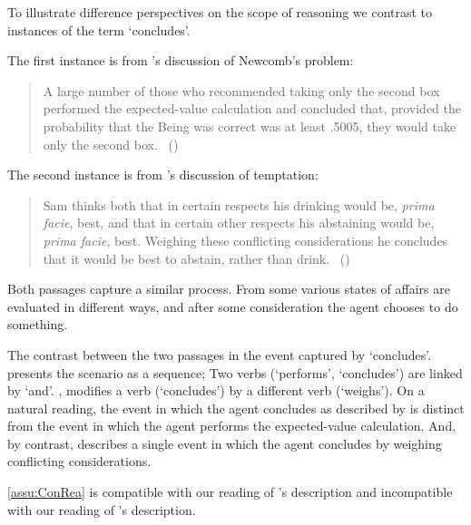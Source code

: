 \begin{note}
  To illustrate difference perspectives on the scope of reasoning we contrast to instances of the term `concludes'.

  The first instance is from \citeauthor{Gardner:1986wp}'s discussion of Newcomb's problem:

  \begin{quote}
    A large number of those who recommended taking only the second box performed the expected-value calculation and concluded that, provided the probability that the Being was correct was at least .5005, they would take only the second box.%
    \mbox{ }\hfill\mbox{(\citeyear[166]{Gardner:1986wp})}
  \end{quote}

  The second instance is from \citeauthor{Bratman:1979aa}'s discussion of temptation:
  \begin{quote}
    Sam thinks both that in certain respects his drinking would be, \emph{prima facie}, best, and that in certain other respects his abstaining would be, \emph{prima facie}, best.
    Weighing these conflicting considerations he concludes that it would be best to abstain, rather than drink.%
    \mbox{ }\hfill\mbox{(\citeyear[156]{Bratman:1979aa})}
  \end{quote}
  Both passages capture a similar process.
  From some \agpe{} various states of affairs are evaluated in different ways, and after some consideration the agent chooses to do something.

  The contrast between the two passages in the event captured by `concludes'.
  \citeauthor{Gardner:1986wp} presents the scenario as a sequence;
  Two verbs (`performs', `concludes') are linked by `and'.
  \citeauthor{Bratman:1979aa}, modifies a verb (`concludes') by a different verb (`weighs').
  On a natural reading, the event in which the agent concludes as described by \citeauthor{Gardner:1986wp} is distinct from the event in which the agent performs the expected-value calculation.
  And, by contrast, \citeauthor{Bratman:1979aa} describes a single event in which the agent concludes by weighing conflicting considerations.

  \autoref{assu:ConRea} is compatible with our reading of \citeauthor{Bratman:1979aa}'s description and incompatible with our reading of \citeauthor{Gardner:1986wp}'s description.


\end{note}
